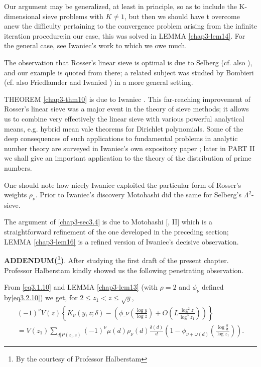 Our argument may be generalized, at least in principle, so as to
include the K-dimensional sieve problems with $K\neq 1$, but then we
should have t overcome anew the difficulty pertaining to the
convergence problem arising from the infinite iteration
procedure;\pageoriginale in 
our case, this was  solved in LEMMA \ref{chap3-lem14}. For the general
case, see Iwaniec's work \cite{key30} to which we owe much. 

The observation that Rosser's linear sieve is optimal is due to
Selberg \cite{key75} (cf. also \cite{key73}), and our example is quoted from
there;  a related subject was studied by Bombieri \cite{key7} (cf. also
Friedlamder and Iwanied \cite{key14}) in a more general setting.  

THEOREM \ref{chap3-thm10} is due to Iwaniec \cite{key31}. This far-reaching
improvement of 
Rosser's linear sieve was a major event in the theory of sieve
methods; it allows us to combine very effectively the linear sieve
with various powerful analytical means, e.g. hybrid mean vale theorems
for Dirichlet polynomials. Some of the deep consequences of such
applications to fundamental problems in analytic number theory are
surveyed in Iwaniec's own expository paper \cite{key33}; later in PART II
we shall give an important application to the theory of the
distribution of prime numbers.  

One should note how nicely Iwaniec exploited the particular form of
Rosser's weights $\rho_\nu$. Prior to Iwaniec's discovery Motohashi
\cite{key52} did the same for Selberg's $\Lambda^2$-sieve.  

The argument of \ref{chap3-sec3.4} is due to Motohashi [\cite{key60},
  II] which is a 
strai\-ghtforward refinement of the one developed in the preceding
section; \- LEMMA \ref{chap3-lem16} is a refined version of Iwaniec's
decisive observation. 

\medskip
\noindent
\textbf{ADDENDUM\pageoriginale (\footnote{By the courtesy of Professor
    Halberstam})}. After studying the first draft of the present
chapter. Professor Halberstam kindly showed us the following
penetrating observation.  

From \eqref{eq3.1.10} and LEMMA \ref{chap3-lem13} (with $\rho = 2$ and
$\phi_\nu$ defined 
by\break \eqref{eq3.2.10}) we get, for $2 \leq z_1 < z \leq \sqrt{y}$, 
\begin{multline*}
  (-1)^\nu V (z) \left\{ K_\nu (y, z; \delta ) - \left(\phi \_\nu
  \left(\frac{\log y}{\log z}\right) + O\left( L \frac{\log^2
    z}{\log^3 z_1}\right) \right) \right\}\\
  = V(z_1) \sum_{d | P(z_1. z)} (-1)^\nu \mu (d) \rho_\nu (d)
  \frac{\delta (d)}{d} \left(1- \phi_{\nu + \omega (d)} \left(\frac{\log
    \frac{y}{d}}{\log z_1}\right)\right).  \tag{i} 
\end{multline*}

